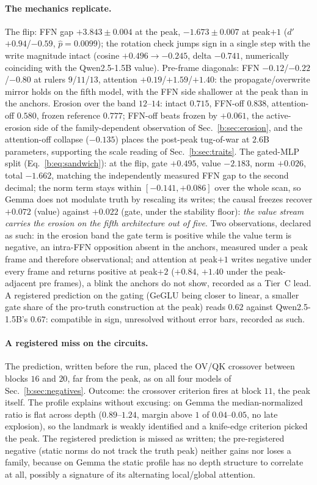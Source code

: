 \documentclass[11pt]{article}
\begin{document}
\paragraph{The mechanics replicate.} The flip: FFN gap $+3.843 \pm 0.004$
at the peak, $-1.673 \pm 0.007$ at peak$+1$ ($d'$ $+0.94$/$-0.59$,
$\hat p = 0.0099$); the rotation check jumps sign in a single step with
the write magnitude intact (cosine $+0.496 \to -0.245$, delta $-0.741$,
numerically coinciding with the Qwen2.5-1.5B value). Pre-frame diagonals:
FFN $-0.12$/$-0.22$/$-0.80$ at rulers $9$/$11$/$13$, attention
$+0.19$/$+1.59$/$+1.40$: the propagate/overwrite mirror holds on the fifth
model, with the FFN side shallower at the peak than in the anchors.
Erosion over the band $12$--$14$: intact $0.715$, FFN-off $0.838$,
attention-off $0.580$, frozen reference $0.777$; FFN-off beats frozen by
$+0.061$, the active-erosion side of the family-dependent observation of
Sec.~\ref{b:sec:erosion}, and the attention-off collapse ($-0.135$) places
the post-peak tug-of-war at $2.6$B parameters, supporting the scale
reading of Sec.~\ref{b:sec:traits}. The gated-MLP split
(Eq.~\ref{b:eq:sandwich}): at the flip, gate $+0.495$, value $-2.183$,
norm $+0.026$, total $-1.662$, matching the independently measured FFN gap
to the second decimal; the norm term stays within $[-0.141, +0.086]$ over
the whole scan, so Gemma does not modulate truth by rescaling its writes;
the causal freezes recover $+0.072$ (value) against $+0.022$ (gate, under
the stability floor): \emph{the value stream carries the erosion on the
fifth architecture out of five}. Two observations, declared as such: in
the erosion band the gate term is positive while the value term is
negative, an intra-FFN opposition absent in the anchors, measured under a
peak frame and therefore observational; and attention at peak$+1$ writes
negative under every frame and returns positive at peak$+2$ ($+0.84$,
$+1.40$ under the peak-adjacent pre frames), a blink the anchors do not
show, recorded as a Tier~C lead. A registered prediction on the gating
(GeGLU being closer to linear, a smaller gate share of the pro-truth
construction at the peak) reads $0.62$ against Qwen2.5-1.5B's $0.67$:
compatible in sign, unresolved without error bars, recorded as such.

\paragraph{A registered miss on the circuits.} The prediction, written
before the run, placed the OV/QK crossover between blocks $16$ and $20$,
far from the peak, as on all four models of
Sec.~\ref{b:sec:negatives}. Outcome: the crossover criterion fires at
block $11$, the peak itself. The profile explains without excusing: on
Gemma the median-normalized ratio is flat across depth ($0.89$--$1.24$,
margin above $1$ of $0.04$--$0.05$, no late explosion), so the landmark is
weakly identified and a knife-edge criterion picked the peak. The
registered prediction is missed as written; the pre-registered negative
(static norms do not track the truth peak) neither gains nor loses a
family, because on Gemma the static profile has no depth structure to
correlate at all, possibly a signature of its alternating local/global
attention.
\end{document}
